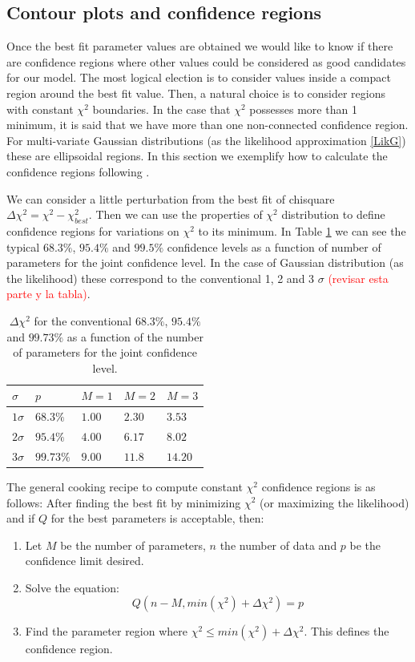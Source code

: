 \documentclass[onecolumn,           %
               showpacs,            %
               preprintnumbers,     %
               aps,                 %
               prl,          	    %
               letterpaper,             %
               superscriptaddress,      %
               nofootinbib,         %
               tightenlines,        %
               floats,floatfix      %
               ,usenatbib,
               ]{revtex4-1}
\begin{document}
\subsection{Contour plots and confidence regions}

Once the best fit parameter values are obtained we would like to know if there are confidence regions where other values could be considered as good candidates for our model. The most logical election is to consider values inside a compact region around the best fit value. Then, a natural choice is to consider regions with constant $\chi^2$ boundaries. In the case that $\chi^2$ possesses more than 1 minimum, it is said that we have more than one non-connected confidence region. For multi-variate Gaussian distributions (as the likelihood approximation \eqref{LikG}) these are ellipsoidal regions. In this section we exemplify how to calculate the confidence regions following \cite{LiV}. 

We can consider a little perturbation from the best fit of chisquare $\Delta\chi^2=\chi^2-\chi^2_{best}$. Then we can use the properties of $\chi^2$ distribution to define confidence regions for variations on $\chi^2$ to its minimum. In Table \ref{tableerrors} we can see the typical $68.3 \%$, $95.4\%$ and $99.5\%$ confidence levels as a function of number of parameters for the joint confidence level. In the case of Gaussian distribution (as the likelihood) these correspond to the conventional 1, 2 and 3 $\sigma$ \textcolor{red}{(revisar esta parte y la tabla)}.
\begin{table}[h!]
\centering
\begin{tabular}{||l|l|l|l|l||} 
 \hline
$\sigma$ & $p$ & $M=1$ & $M=2$ & $M=3$\\
\hline
$1\sigma$ & $68.3 \%$ & $1.00$ & $2.30$ & $3.53$\\
$2\sigma$ & $95.4 \%$ & $4.00$ & $6.17$ & $8.02$\\
$3\sigma$ & $99.73\%$ & $9.00$ & $11.8$ & $14.20$\\
\hline
\end{tabular}
\caption{\footnotesize{$\Delta \chi^2$ for the conventional $68.3\%$, $95.4\%$ and $99.73\%$ as a function of the number of parameters for the joint confidence level.}}\label{tableerrors}
\end{table}

The general cooking recipe to compute constant $\chi^2$ confidence regions is as follows: After finding the best fit by minimizing $\chi^2$ (or maximizing the likelihood) and if $Q$ for the best parameters is acceptable, then:
\begin{enumerate}
\item Let $M$ be the number of parameters, $n$ the number of data and $p$ be the confidence limit desired.
\item Solve the equation:
\begin{equation}
Q(n-M,min(\chi^2)+\Delta\chi^2)=p
\end{equation}
\item Find the parameter region where $\chi^2\leq min(\chi^2)+\Delta\chi^2$. This defines the confidence region.
\end{enumerate}
\end{document}
